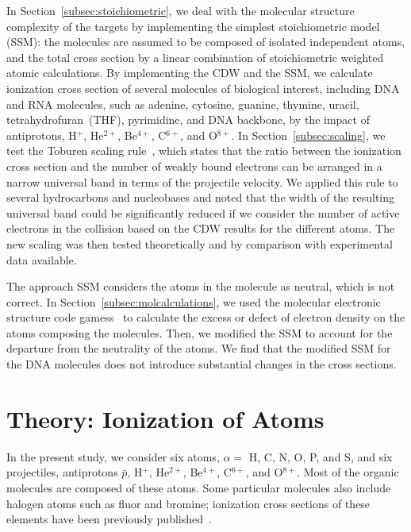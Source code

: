 \documentclass[10pt,showpacs,twocolumn]{revtex4}
\begin{document}
In Section~\ref{subsec:stoichiometric}, we deal with the molecular 
structure complexity of the targets by 
implementing the simplest stoichiometric model (SSM): the molecules are 
assumed to be composed of isolated independent atoms, and the total 
cross section by a linear combination of stoichiometric weighted atomic 
calculations.
By implementing the CDW and the SSM, we calculate ionization 
cross section of several molecules of biological interest, including 
DNA and RNA molecules, such as adenine, cytosine, guanine, thymine, uracil, 
tetrahydrofuran~(THF), pyrimidine, and DNA backbone, by the impact 
of antiprotons, H$^{+}$, He$^{2+}$, Be$^{4+}$, C$^{6+}$, and O$^{8+}$. 
In Section~\ref{subsec:scaling}, we
test the Toburen scaling rule~\cite{toburen1975,toburen1976}, which 
states that the ratio between the ionization cross section and the 
number of weakly bound electrons can be arranged in a narrow universal 
band in terms of the projectile velocity. We applied this rule to 
several hydrocarbons and nucleobases and noted that the width of the 
resulting universal band could be significantly reduced if we consider 
the number of active electrons in the collision based on the 
CDW results for the different atoms. The new scaling was then tested 
theoretically and by comparison with experimental data available.

The approach SSM considers the atoms in the molecule as neutral, 
which is not correct. In Section~\ref{subsec:molcalculations}, 
we used the molecular electronic structure code 
{\sc gamess}~\cite{gamess} to calculate the excess or defect of 
electron density on the atoms composing the molecules. Then, we modified 
the SSM to account for the departure from the neutrality of the atoms. 
We find that the modified SSM for the DNA molecules does not introduce 
substantial changes in the cross sections.

\section{Theory: Ionization of Atoms}
\label{sec:atoms}

In the present study, we consider six atoms, $\alpha=$ H, C, N, O, P, 
and S, and six projectiles, antiprotons $\bar{p}$, H$^{+}$, He$^{2+}$, 
Be$^{4+}$, C$^{6+}$, and O$^{8+}$. 
Most of the organic molecules are composed of these atoms. Some 
particular molecules also include halogen atoms such as fluor and 
bromine; ionization cross sections of these elements have been 
previously published~\cite{miraglia2008}.
\end{document}
